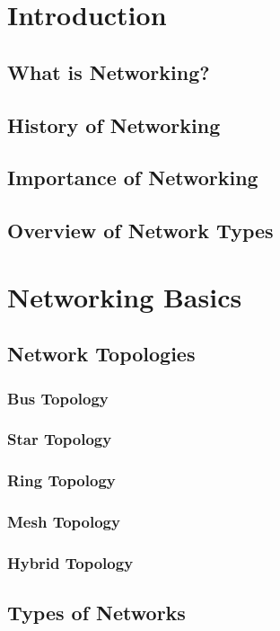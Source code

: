 \documentclass{book}
\begin{document}
\tableofcontents

\chapter{Introduction}
    \section{What is Networking?}
    \section{History of Networking}
    \section{Importance of Networking}
    \section{Overview of Network Types}
    
\chapter{Networking Basics}
    \section{Network Topologies}
        \subsection{Bus Topology}
        \subsection{Star Topology}
        \subsection{Ring Topology}
        \subsection{Mesh Topology}
        \subsection{Hybrid Topology}
    \section{Types of Networks}
\end{document}
